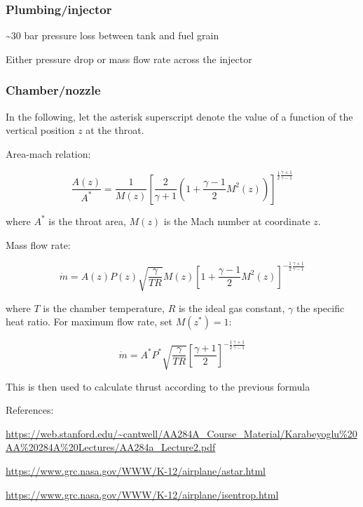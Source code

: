 \documentclass[fleqn]{article}
\begin{document}
\subsubsection{Plumbing/injector}
\label{sec:org92da7e7}

\textasciitilde{}30 bar pressure loss between tank and fuel grain

Either pressure drop or mass flow rate across the injector
\subsubsection{Chamber/nozzle}
\label{sec:org10852d4}

In the following, let the asterisk superscript denote the value of a function of
the vertical position \(z\) at the throat.

Area-mach relation:

\begin{equation*}
\frac{A(z)}{A^*}
= \frac{1}{M(z)} \left[
  \frac{2}{\gamma+1} \left(1 + \frac{\gamma-1}{2} M^2(z)\right)
\right]^{\frac12\frac{\gamma+1}{\gamma-1}}
\end{equation*}

where \(A^*\) is the throat area, \(M(z)\) is the Mach number at coordinate \(z\).

Mass flow rate:

\begin{equation*}
\dot{m}
= A(z) P(z) \sqrt{\frac{\gamma}{T R}} M(z) \left[
  1 + \frac{\gamma-1}{2}M^2(z)
\right]^{-\frac12 \frac{\gamma+1}{\gamma-1}}
\end{equation*}

where \(T\) is the chamber temperature, \(R\) is the ideal gas constant, \(\gamma\)
the specific heat ratio. For maximum flow rate, set \(M(z^*)=1\):

\begin{equation*}
\dot{m}
= A^* P^* \sqrt{\frac{\gamma}{TR}}
  \left[ \frac{\gamma+1}{2} \right]^{-\frac12 \frac{\gamma+1}{\gamma-1}}
\end{equation*}

This is then used to calculate thrust according to the previous formula

References:

\url{https://web.stanford.edu/\~cantwell/AA284A\_Course\_Material/Karabeyoglu\%20AA\%20284A\%20Lectures/AA284a\_Lecture2.pdf}

\url{https://www.grc.nasa.gov/WWW/K-12/airplane/astar.html}

\url{https://www.grc.nasa.gov/WWW/K-12/airplane/isentrop.html}
\end{document}
